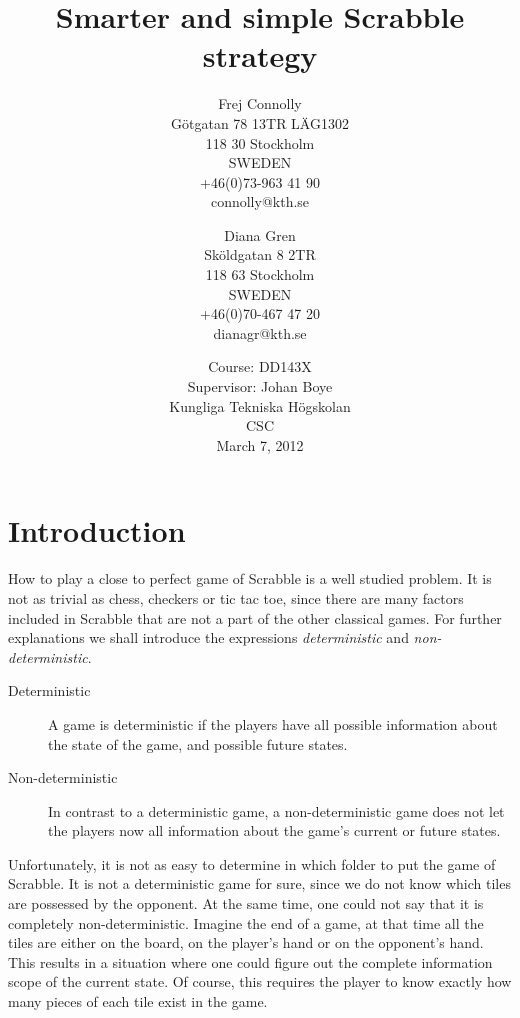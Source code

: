 \documentclass[a4paper, 12pt]{report}
\begin{document}
\title{Smarter and simple Scrabble strategy}
\date{Course: DD143X \\ Supervisor: Johan Boye \\ Kungliga Tekniska Högskolan \\ CSC \\ March 7, 2012}
\author{Frej Connolly \\ Götgatan 78 13TR LÄG1302 \\ 118 30 Stockholm \\ SWEDEN \\ +46(0)73-963 41 90 \\ connolly@kth.se \\
        \and Diana Gren \\ Sköldgatan 8 2TR \\ 118 63 Stockholm \\ SWEDEN \\ +46(0)70-467 47 20 \\ dianagr@kth.se}

\maketitle
\tableofcontents

\chapter{Introduction}
How to play a close to perfect game of Scrabble is a well studied problem. It is not as trivial as chess, checkers or tic tac toe, since there are many factors included in Scrabble that are not a part of the other classical games. For further explanations we shall introduce the expressions \emph{deterministic} and \emph{non-deterministic}. 

\begin{description}
\item[Deterministic] A game is deterministic if the players have all possible information about the state of the game, and possible future states.
\item[Non-deterministic] In contrast to a deterministic game, a non-deterministic game does not let the players now all information about the game's current or future states.
\end{description}

Unfortunately, it is not as easy to determine in which folder to put the game of Scrabble. It is not a deterministic game for sure, since we do not know which tiles are possessed by the opponent. At the same time, one could not say that it is completely non-deterministic. Imagine the end of a game, at that time all the tiles are either on the board, on the player's hand or on the opponent's hand. This results in a situation where one could figure out the complete information scope of the current state. Of course, this requires the player to know exactly how many pieces of each tile exist in the game.
\end{document}
